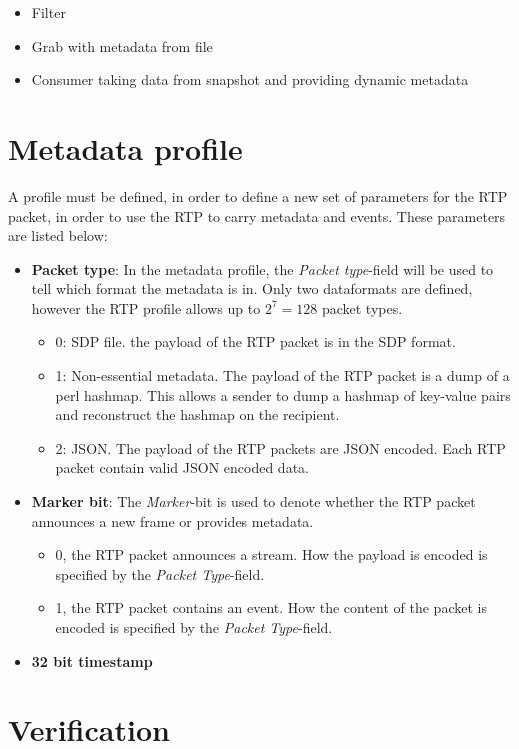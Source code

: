 \begin{itemize}
	\item Filter
	\item Grab with metadata from file
	\item Consumer taking data from snapshot and providing dynamic metadata
\end{itemize}

\section{Metadata profile} \label{sec:implemented:metadataprofile} 
A profile must be defined, in order to define a new set of parameters for the RTP packet, in order to use the RTP to carry metadata and events. These parameters are listed below:

\begin{itemize}
	\item \textbf{Packet type}: In the metadata profile, the \textit{Packet type}-field will be used to tell which format the metadata is in. Only two  dataformats are defined, however the RTP profile allows up to $2^7=128$  packet types.
		\begin{itemize}
			\item 0: SDP file. the payload of the RTP packet is in the SDP format.
			\item 1: Non-essential metadata. The payload of the RTP packet is a dump of a perl hashmap. This allows a sender to dump a hashmap of key-value pairs and reconstruct the hashmap on the recipient.
			\item 2: JSON. The payload of the RTP packets are JSON encoded. Each RTP packet contain valid JSON encoded data.
		\end{itemize}
	\item \textbf{Marker bit}: The \textit{Marker}-bit is used to denote whether the RTP packet announces a new frame or provides metadata.
		\begin{itemize}
			\item 0, the RTP packet announces a stream. How the payload is encoded is specified by the \textit{Packet Type}-field.
			\item 1, the RTP packet contains an event. How the content of the packet is encoded is specified by the \textit{Packet Type}-field.
		\end{itemize}
	\item \textbf{32 bit timestamp}
\end{itemize}


\section{Verification} \label{sec:implementation:verification}



